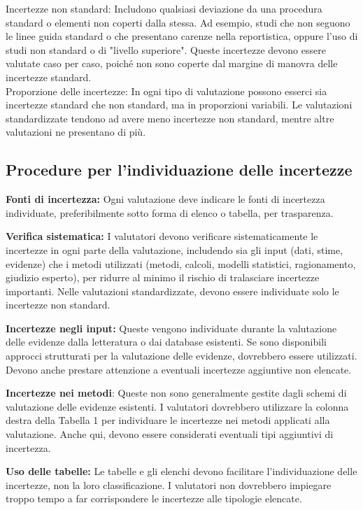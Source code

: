 Incertezze non standard: Includono qualsiasi deviazione da una procedura standard o elementi non coperti dalla stessa. Ad esempio, studi che non seguono le linee guida standard o che presentano carenze nella reportistica, oppure l'uso di studi non standard o di "livello superiore". Queste incertezze devono essere valutate caso per caso, poiché non sono coperte dal margine di manovra delle incertezze standard.\\

Proporzione delle incertezze: In ogni tipo di valutazione possono esserci sia incertezze standard che non standard, ma in proporzioni variabili. Le valutazioni standardizzate tendono ad avere meno incertezze non standard, mentre altre valutazioni ne presentano di più.



\subsection{Procedure per l'individuazione delle incertezze} 

\indent\textbf{Fonti di incertezza:} Ogni valutazione deve indicare le fonti di incertezza individuate, preferibilmente sotto forma di elenco o tabella, per trasparenza.

\textbf{Verifica sistematica:} I valutatori devono verificare sistematicamente le incertezze in ogni parte della valutazione, includendo sia gli input (dati, stime, evidenze) che i metodi utilizzati (metodi, calcoli, modelli statistici, ragionamento, giudizio esperto), per ridurre al minimo il rischio di tralasciare incertezze importanti. Nelle valutazioni standardizzate, devono essere individuate solo le incertezze non standard.

\textbf{Incertezze negli input:} Queste vengono individuate durante la valutazione delle evidenze dalla letteratura o dai database esistenti. Se sono disponibili approcci strutturati per la valutazione delle evidenze, dovrebbero essere utilizzati. Devono anche prestare attenzione a eventuali incertezze aggiuntive non elencate.
 
\textbf{Incertezze nei metodi}: Queste non sono generalmente gestite dagli schemi di valutazione delle evidenze esistenti. I valutatori dovrebbero utilizzare la colonna destra della Tabella 1 per individuare le incertezze nei metodi applicati alla valutazione. Anche qui, devono essere considerati eventuali tipi aggiuntivi di incertezza.

\textbf{Uso delle tabelle:} Le tabelle e gli elenchi devono facilitare l'individuazione delle incertezze, non la loro classificazione. I valutatori non dovrebbero impiegare troppo tempo a far corrispondere le incertezze alle tipologie elencate.

